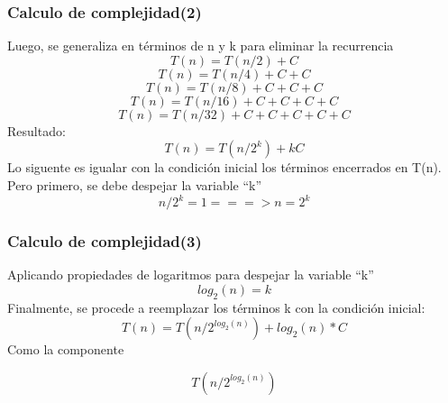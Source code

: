 \documentclass{beamer}
\begin{document}
		\begin{frame}
			\frametitle{Calculo de complejidad(2)}
		Luego, se generaliza en términos de n y k para eliminar la recurrencia
			\begin{equation}
					T(n) = T(n/2) + C
				\end{equation}
			\begin{equation}
					T(n) = T(n/4) + C + C
				\end{equation}
             \begin{equation}
					T(n) = T(n/8) + C + C + C
				\end{equation}
				  \begin{equation}
					T(n) = T(n/16) + C + C + C + C
				\end{equation}
			  \begin{equation}
					T(n) = T(n/32) + C + C + C + C + C
				\end{equation}
				Resultado:
			  \begin{equation}
					T(n) = T(n/2^k) + kC
				\end{equation}
				Lo siguente es igualar con la condición inicial los términos encerrados en T(n). Pero primero, se debe despejar la variable “k”
              \begin{equation}
					n/2^k = 1 ===> n = 2^k
				\end{equation}
				
		\end{frame}
		
	

		\begin{frame}
			\frametitle{Calculo de complejidad(3)}
		Aplicando propiedades de logaritmos para despejar la variable “k”
			\begin{equation}
					log_2 {(n)} = k
				\end{equation}
		Finalmente, se procede a reemplazar los términos k con la condición inicial:
			\begin{equation}
					T(n) = T(n/2^{log_2 {(n)}}) + log_2 {(n)} * C
				\end{equation}
		Como la componente 

               \begin{equation}
                    T(n/2^{log_2 {(n)}})
                   \end{equation}


		\end{frame}
\end{document}
